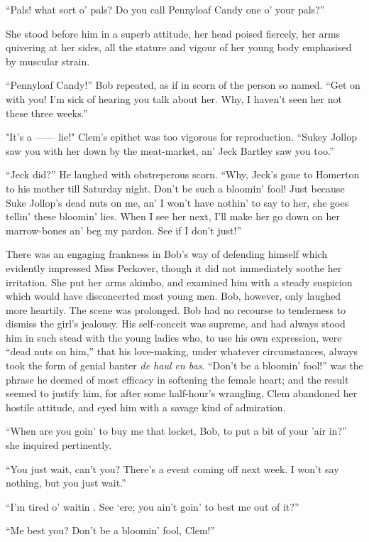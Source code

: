 ``Pals! what sort o' pals? Do you call Pennyloaf Candy one o' your
pals?''

She stood before him in a superb attitude, her head poised fiercely, her
arms quivering at her sides, all the stature and vigour of her young
body emphasised by muscular strain.

``Pennyloaf Candy!'' Bob repeated, as if in scorn of the person so
named. ``Get on with you! I'm sick of hearing you talk about her. Why, I
haven't seen her not these three weeks.''

{}"It's a {{------}} lie!" Clem's epithet was too vigorous for
reproduction. ``Sukey Jollop saw you with her down by the meat-market,
an' Jeck Bartley saw you too.''

``Jeck did?'' He laughed with obstreperous scorn. ``Why, Jeck's gone to
Homerton to his mother till Saturday night. Don't be such a bloomin'
fool! Just because Suke Jollop's dead nuts on me, an' I won't have
nothin' to say to her, she goes tellin' these bloomin' lies. When I see
her next, I'll make her go down on her marrow-bones an' beg my pardon.
See if I don't just!''

There was an engaging frankness in Bob's way of defending himself which
evidently impressed Miss Peckover, though it did not immediately soothe
her irritation. She put her arms akimbo, and examined him with a steady
suspicion which would have disconcerted most young men. Bob, however,
only laughed more heartily. The scene was prolonged. Bob had no recourse
to tenderness to dismiss the girl's jealousy. His self-conceit was
supreme, and had always stood him {}in such stead with the young ladies
who, to use his own expression, were ``dead nuts on him,'' that his
love-making, under whatever circumstances, always took the form of
genial banter \emph{de haul en bas}. ``Don't be a bloomin' fool!'' was
the phrase he deemed of most efficacy in softening the female heart; and
the result seemed to justify him, for after some half-hour's wrangling,
Clem abandoned her hostile attitude, and eyed him with a savage kind of
admiration.

``When are you goin' to buy me that locket, Bob, to put a bit of your
'air in?'' she inquired pertinently.

``You just wait, can't you? There's a event coming off next week. I
won't say nothing, but you just wait.''

``I'm tired o' waitin . See `ere; you ain't goin' to best me out of
it?''

``Me best you? Don't be a bloomin' fool, Clem!''

